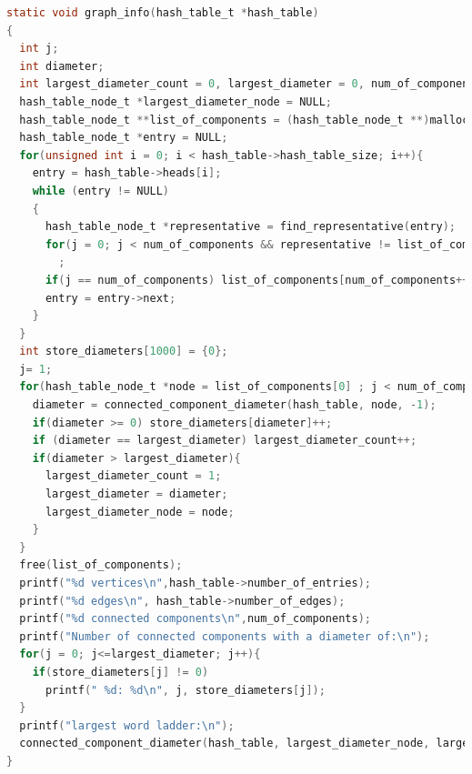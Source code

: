 	\begin{lstlisting}[language=C]
static void graph_info(hash_table_t *hash_table)
{
  int j;
  int diameter;
  int largest_diameter_count = 0, largest_diameter = 0, num_of_components = 0;
  hash_table_node_t *largest_diameter_node = NULL;
  hash_table_node_t **list_of_components = (hash_table_node_t **)malloc(sizeof(hash_table_node_t) * (hash_table->hash_table_size)/2);
  hash_table_node_t *entry = NULL;
  for(unsigned int i = 0; i < hash_table->hash_table_size; i++){
    entry = hash_table->heads[i];
    while (entry != NULL)
    {
      hash_table_node_t *representative = find_representative(entry);
      for(j = 0; j < num_of_components && representative != list_of_components[j]; j++)
        ;
      if(j == num_of_components) list_of_components[num_of_components++] = representative;
      entry = entry->next;
    }
  }
  int store_diameters[1000] = {0};
  j= 1;
  for(hash_table_node_t *node = list_of_components[0] ; j < num_of_components; node = list_of_components[j++]){
    diameter = connected_component_diameter(hash_table, node, -1);
    if(diameter >= 0) store_diameters[diameter]++;
    if (diameter == largest_diameter) largest_diameter_count++;
    if(diameter > largest_diameter){
      largest_diameter_count = 1;
      largest_diameter = diameter;
      largest_diameter_node = node;
    }
  }
  free(list_of_components);
  printf("%d vertices\n",hash_table->number_of_entries);
  printf("%d edges\n", hash_table->number_of_edges);
  printf("%d connected components\n",num_of_components);
  printf("Number of connected components with a diameter of:\n");
  for(j = 0; j<=largest_diameter; j++){
    if(store_diameters[j] != 0) 
      printf(" %d: %d\n", j, store_diameters[j]);
  }
  printf("largest word ladder:\n");
  connected_component_diameter(hash_table, largest_diameter_node, largest_diameter);
}
	\end{lstlisting}
